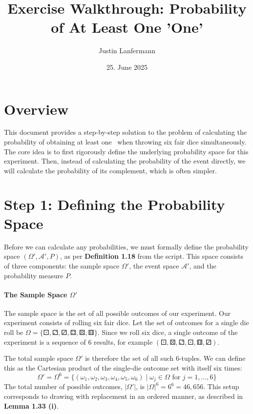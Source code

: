 \documentclass[11pt,a4paper]{article}
\title{\textbf{Exercise Walkthrough: Probability of At Least One 'One'}}
\author{Justin Lanfermann}
\date{25. June 2025}
\begin{document}
\maketitle

\section{Overview}
This document provides a step-by-step solution to the problem of calculating the probability of obtaining at least one \dicei\ when throwing six fair dice simultaneously. The core idea is to first rigorously define the underlying probability space for this experiment. Then, instead of calculating the probability of the event directly, we will calculate the probability of its complement, which is often simpler.

\section{Step 1: Defining the Probability Space}

Before we can calculate any probabilities, we must formally define the probability space $(\Omega', \mathcal{A}', P)$, as per \textbf{Definition 1.18} from the script. This space consists of three components: the sample space $\Omega'$, the event space $\mathcal{A}'$, and the probability measure $P$.

\paragraph{The Sample Space $\Omega'$}
The sample space is the set of all possible outcomes of our experiment. Our experiment consists of rolling six fair dice. Let the set of outcomes for a single die roll be $\Omega = \{\dicei, \diceii, \diceiii, \diceiv, \dicev, \dicevi\}$.
Since we roll six dice, a single outcome of the experiment is a sequence of 6 results, for example $(\dicei, \dicev, \diceii, \dicei, \dicevi, \diceiii)$.

The total sample space $\Omega'$ is therefore the set of all such 6-tuples. We can define this as the Cartesian product of the single-die outcome set with itself six times:
\[
\Omega' = \Omega^6 = \{ (\omega_1, \omega_2, \omega_3, \omega_4, \omega_5, \omega_6) \mid \omega_j \in \Omega \text{ for } j=1,\dots,6 \}
\]
The total number of possible outcomes, $|\Omega'|$, is $|\Omega|^6 = 6^6 = 46,656$. This setup corresponds to drawing with replacement in an ordered manner, as described in \textbf{Lemma 1.33 (i)}.
\end{document}
